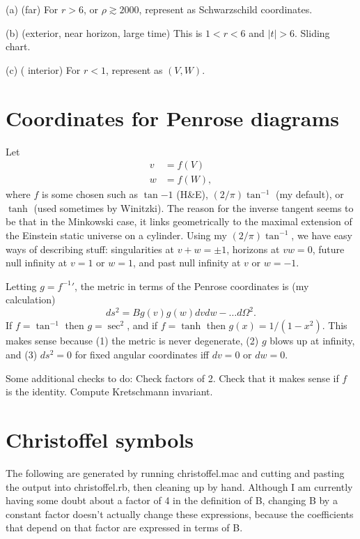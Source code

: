 \documentclass{article}
\begin{document}
(a) (far) For $r>6$,
or $\rho\gtrsim 2000$, represent as Schwarzschild coordinates.

(b) (exterior, near horizon, large time) This is $1<r<6$ and $|t|>6$. Sliding chart.

(c) ( interior) For $r<1$, represent as $(V,W)$.

\section{Coordinates for Penrose diagrams}

Let
\begin{align}
  v &= f(V)\\
  w &= f(W),
\end{align}
where $f$ is some chosen such as $\tan{-1}$ (H\&E), $(2/\pi)\tan^{-1}$ (my default),
or $\tanh$ (used sometimes by Winitzki). The reason for the inverse tangent seems to be
that in the Minkowski case, it links geometrically to the maximal extension of the Einstein static universe
on a cylinder. Using my $(2/\pi)\tan^{-1}$, we have easy ways of describing stuff:
singularities at $v+w=\pm1$, horizons at $vw=0$, future null infinity at $v=1$ or $w=1$,
and past null infinity at $v$ or $w=-1$.

Letting $g={f^{-1}}'$, the metric in terms of the Penrose coordinates is (my calculation)
\begin{equation}
  ds^2 = B g(v)g(w)dvdw-\ldots d\Omega^2.
\end{equation}
If $f=\tan^{-1}$ then $g=\sec^2$,
and if $f=\tanh$ then $g(x)=1/(1-x^2)$. This makes sense because (1) the metric is never degenerate,
(2) $g$ blows up at infinity, and (3) $ds^2=0$ for fixed angular coordinates iff $dv=0$ or $dw=0$.

Some additional checks to do: 
Check factors of 2. Check that it makes sense if $f$ is the identity.
Compute Kretschmann invariant.

\section{Christoffel symbols}

The following are generated by running christoffel.mac and cutting and pasting the output into
christoffel.rb, then cleaning up by hand. Although I am currently having some doubt about a
factor of 4 in the definition of B,
changing B by a constant factor doesn't actually change these expressions, because the
coefficients that depend on that factor
are expressed in terms of B.
\end{document}
